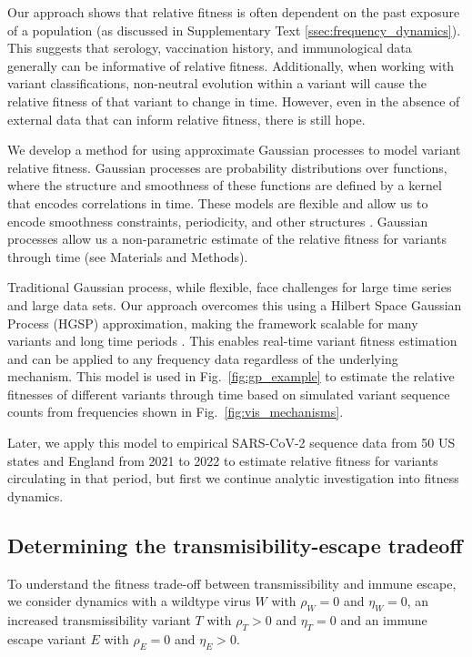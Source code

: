\documentclass[11pt,oneside,letterpaper]{article}
\newcommand{\wt}{W}
\newcommand{\varE}{E}
\newcommand{\varT}{T}
\newcommand{\varEscape}{\eta}
\newcommand{\varTransmission}{\rho}
\begin{document}
Our approach shows that relative fitness is often dependent on the past exposure of a population (as discussed in Supplementary Text \ref{ssec:frequency_dynamics}).
This suggests that serology, vaccination history, and immunological data generally can be informative of relative fitness.
Additionally, when working with variant classifications, non-neutral evolution within a variant will cause the relative fitness of that variant to change in time.
However, even in the absence of external data that can inform relative fitness, there is still hope.

We develop a method for using approximate Gaussian processes to model variant relative fitness.
Gaussian processes are probability distributions over functions, where the structure and smoothness of these functions are defined by a kernel that encodes correlations in time.
These models are flexible and allow us to encode smoothness constraints, periodicity, and other structures \cite{Gortler2019a}.
Gaussian processes allow us a non-parametric estimate of the relative fitness for variants through time (see Materials and Methods).

Traditional Gaussian process, while flexible, face challenges for large time series and large data sets.
Our approach overcomes this using a Hilbert Space Gaussian Process (HGSP) approximation, making the framework scalable for many variants and long time periods \cite{riutortmayol2022practical}.
This enables real-time variant fitness estimation and can be applied to any frequency data regardless of the underlying mechanism.
This model is used in Fig.~\ref{fig:gp_example} to estimate the relative fitnesses of different variants through time based on simulated variant sequence counts from frequencies shown in Fig.~\ref{fig:vis_mechanisms}.

Later, we apply this model to empirical SARS-CoV-2 sequence data from 50 US states and England from 2021 to 2022 to estimate relative fitness for variants circulating in that period, but first we continue analytic investigation into fitness dynamics.

\subsection*{Determining the transmisibility-escape tradeoff}

To understand the fitness trade-off between transmissibility and immune escape, we consider dynamics with a wildtype virus $\wt$ with $\varTransmission_\wt = 0$ and $\varEscape_\wt = 0$, an increased transmissibility variant $\varT$ with $\varTransmission_\varT > 0$ and $\varEscape_\varT = 0$ and an immune escape variant $\varE$ with $\varTransmission_\varE = 0$ and $\varEscape_\varE > 0$.
\end{document}
